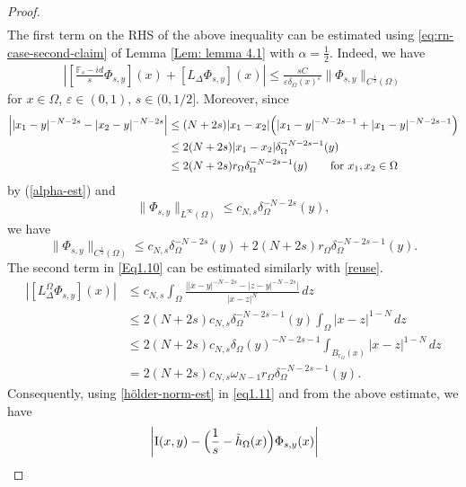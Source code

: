 \documentclass[notitlepage,11pt,reqno]{amsart}
\theoremstyle{definition}
\numberwithin{equation}{section}
\begin{document}
\begin{proof}
\begin{align}
\end{align}
The first term on the RHS of the above inequality can be estimated using \eqref{eq:rn-case-second-claim} of Lemma \ref{Lem: lemma 4.1} with $\alpha = \frac{1}{2}$. Indeed, we have
\begin{align}\label{eq1.11}
\left|\left[\frac{\mathbb{F}_s-id}{s} \Phi_{s, y}\right](x)+[L_{\Delta}\Phi_{s, y}](x)\right| \leq \frac{sC}{\varepsilon \delta_{\Omega}(x)^{\varepsilon}}\|\Phi_{s, y}\|_{C^{\frac{1}{2}}(\Omega)}    
\end{align}
for $x\in \Omega$, $\varepsilon \in (0,1)$, $s \in (0, 1/2]$. Moreover, since
\begin{align}
  \Bigl||x_1-y|^{-N-2s}-|x_2-y|^{-N-2s}\Bigr| &\le (N+2s) |x_1-x_2|\Bigl(|x_1-y|^{-N-2s-1}+|x_1-y|^{-N-2s-1}\Bigr)\notag\\
   &\le 2(N+2s) |x_1-x_2|\delta_\Omega^{-N-2s-1}(y)\label{reuse}\\
                                              &\le 2(N+2s)r_{\Omega}\delta_\Omega^{-N-2s-1}(y) \qquad \text{for $x_1,x_2 \in \Omega$}\notag
\end{align}
by (\ref{alpha-est}) and 
\begin{equation}
  \label{sup-norm-est}
  \|\Phi_{s, y}\|_{L^\infty(\Omega)} \le c_{N,s}\delta_\Omega^{-N-2s}(y),    
\end{equation}
we have   
\begin{equation}
  \label{hölder-norm-est}
  \|\Phi_{s, y}\|_{C^{\frac{1}{2}}(\Omega)} \le  c_{N,s}\delta_\Omega^{-N-2s}(y)+  2(N+2s)r_{\Omega}\delta_\Omega^{-N-2s-1}(y).    
\end{equation}
The second term in \eqref{Eq1.10} can be estimated similarly with \eqref{reuse}. 
\begin{align*}
  |[L_{\Delta}^\Omega\Phi_{s, y}](x)|&\le c_{N,s}\int_{\Omega}\frac{\bigl| |x-y|^{-N-2s}-|z-y|^{-N-2s}\bigr|}{|x-z|^N}\,dz\\
  &\le  2(N+2s)  c_{N,s}\delta_\Omega^{-N-2s-1}(y) \int_{\Omega} |x-z|^{1-N}\,dz \\
  &\le  2(N+2s)  c_{N,s} \delta_\Omega(y)^{-N-2s-1} \int_{B_{r_{\Omega}}(x)} |x-z|^{1-N}\,dz\\
&=2 (N+2s)c_{N,s} \omega_{N-1} r_\Omega \delta_\Omega^{-N-2s-1}(y).
  \end{align*}
  Consequently, using \eqref{hölder-norm-est} in \eqref{eq1.11} and from the above estimate, we have
  \begin{align}
    \label{eq:I-final-est}
    &\left|\mathrm{I}(x,y)- \Bigl(\frac{1}{s} - \tilde h_\Omega(x)\Bigr)\Phi_{s,y}(x) \right|\\

\end{align}
\end{proof}
\end{document}
